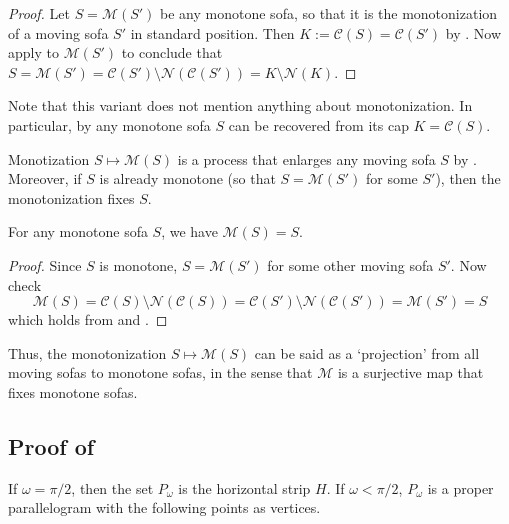 \begin{proof}
Let \(S = \mathcal{M}(S')\) be any monotone sofa, so that it is the monotonization of a moving sofa \(S'\) in standard position. Then \(K := \mathcal{C}(S) = \mathcal{C}(S')\) by . Now apply  to \(\mathcal{M}(S')\) to conclude that \(S = \mathcal{M}(S') = \mathcal{C}(S') \setminus \mathcal{N}(\mathcal{C}(S')) = K \setminus \mathcal{N}(K)\).
\end{proof}

Note that this variant does not mention anything about monotonization. In particular, by  any monotone sofa \(S\) can be recovered from its cap \(K = \mathcal{C}(S)\).

Monotization \(S \mapsto \mathcal{M}(S)\) is a process that enlarges any moving sofa \(S\) by . Moreover, if \(S\) is already monotone (so that \(S = \mathcal{M}(S')\) for some \(S'\)), then the monotonization fixes \(S\).

\begin{theorem}

For any monotone sofa \(S\), we have \(\mathcal{M}(S) = S\).

\label{thm:monotonization-fixpoint}
\end{theorem}

\begin{proof}
Since \(S\) is monotone, \(S = \mathcal{M}(S')\) for some other moving sofa \(S'\). Now check
\[
\mathcal{M}(S) = \mathcal{C}(S) \setminus \mathcal{N}(\mathcal{C}(S)) = \mathcal{C}(S') \setminus \mathcal{N}(\mathcal{C}(S')) = \mathcal{M}(S') = S
\]
which holds from  and .
\end{proof}

Thus, the monotonization \(S \mapsto \mathcal{M}(S)\) can be said as a ‘projection’ from all moving sofas to monotone sofas, in the sense that \(\mathcal{M}\) is a surjective map that fixes monotone sofas.

\subsection{Proof of }

If \(\omega = \pi / 2\), then the set \(P_\omega\) is the horizontal strip \(H\). If \(\omega < \pi/2\), \(P_\omega\) is a proper parallelogram with the following points as vertices.

